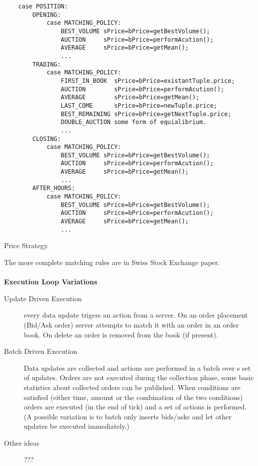 \documentclass{article}
\begin{document}
\begin{program}
    \begin{verbatim}    
    case POSITION:
        OPENING:
            case MATCHING_POLICY:
                BEST_VOLUME sPrice=bPrice=getBestVolume();
                AUCTION     sPrice=bPrice=performAcution();
                AVERAGE     sPrice=bPrice=getMean();
                ...
        TRADING:
            case MATCHING_POLICY:
                FIRST_IN_BOOK  sPrice=bPrice=existantTuple.price;
                AUCTION        sPrice=bPrice=performAcution();
                AVERAGE        sPrice=bPrice=getMean();
                LAST_COME      sPrice=bPrice=newTuple.price;
                BEST_REMAINING sPrice=bPrice=getNextTuple.price;
                DOUBLE_AUCTION some form of equialibrium.
                ...       
        CLOSING:
            case MATCHING_POLICY:
                BEST_VOLUME sPrice=bPrice=getBestVolume();
                AUCTION     sPrice=bPrice=performAcution();
                AVERAGE     sPrice=bPrice=getMean();
                ...
        AFTER_HOURS:
            case MATCHING_POLICY:
                BEST_VOLUME sPrice=bPrice=getBestVolume();
                AUCTION     sPrice=bPrice=performAcution();
                AVERAGE     sPrice=bPrice=getMean();
                ...
    \end{verbatim}
\caption{Price Strategy. }
\end{program}

The more complete matching rules are in Swiss Stock Exchange paper.
\\
\\
{\bf Execution Loop Variations}

\begin{description}
    \item[Update Driven Execution] every data update trigers an action from a server. On an order placement (Bid/Ask order) server attempts to match it with an order in an order book. On delete an order is removed from the book (if present).
    \item[Batch Driven Execution] Data updates are collected and actions are performed in a batch over s set of updates. Orders are not executed during the collection phase, some basic statistics about collected orders can be published. When conditions are satisfied (either time, amount or the combination of the two conditions) orders are executed (in the end of tick) and a set of actions is performed. (A possible variation is to batch only inserts bids/asks and let other updates be executed immediately.)
    \item[Other ideas] ???
\end{description}
\end{document}
